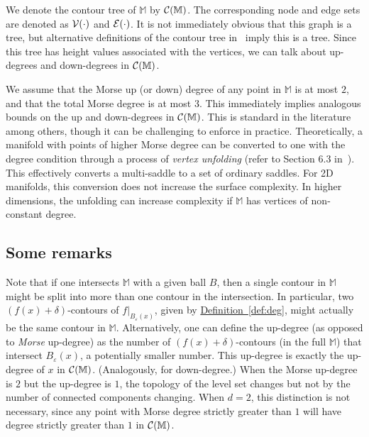 \documentclass[11pt]{article}
\theoremstyle{definition}
\newcommand{\cC}{{\cal C}}
\newcommand{\cE}{{\cal E}}
\newcommand{\cV}{{\cal V}}
\newcommand{\MM}{\mathbb{M}}
\newcommand{\eps}{\varepsilon}
\newcommand{\Def}[1]{\hyperref[def:#1]{Definition~\ref*{def:#1}}} %
\newcommand{\reeb}{\cC}
\begin{document}
We denote the contour tree of $\MM$
by $\reeb(\MM)$. The corresponding node and edge sets are denoted as $\cV(\cdot)$ and $\cE(\cdot)$.
It is not immediately obvious that this graph is a tree, but alternative definitions of the contour tree
in~\cite{csa-cctad-03} imply this is a tree. 
Since this tree has height values associated with the vertices, we can talk about up-degrees and down-degrees in $\reeb(\MM)$.
%

We assume that the Morse up (or down) degree of any point
in $\MM$ is at most $2$, and that the total Morse degree
is at most $3$. This immediately implies analogous bounds
on the up and down-degrees in $\reeb(\MM)$. This
is standard in the literature
among others, though it can be challenging to enforce in 
practice. Theoretically, a manifold with points of higher Morse degree
can be converted to one with the degree condition through
a process of \emph{vertex unfolding} (refer to
Section 6.3 in~\cite{HaEd10}). This effectively converts
a multi-saddle to a set of ordinary saddles.
For 2D manifolds,
this conversion does not increase the surface complexity.
In higher dimensions, the unfolding can increase complexity if
$\MM$ has vertices of non-constant degree.


%



\subsection{Some remarks}
Note that if one intersects $\MM$ with a given ball $B$, then a single contour in $\MM$ might be split into more than one contour in the intersection. 
In particular, two $(f(x)+\delta)$-contours of $f|_{B_\eps(x)}$, given by \Def{deg}, might actually be the same contour in $\MM$. 
Alternatively, one can define the up-degree (as opposed to \emph{Morse} up-degree) as the number of $(f(x)+\delta)$-contours (in the full $\MM$)
that intersect $B_\eps(x)$, a potentially smaller number. This up-degree
is exactly the up-degree of $x$ in $\reeb(\MM)$. (Analogously, for down-degree.)
When the Morse up-degree is $2$ but the up-degree is $1$, the topology of the level set changes but not by the number of connected components changing.
When $d=2$, this distinction is not necessary, since any point with Morse degree strictly greater than $1$ will have degree strictly greater than $1$ in $\reeb(\MM)$.
\end{document}
